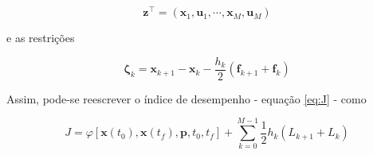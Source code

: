 \begin{equation}
    \mathbf{z}^\intercal = \left( \mathbf{x}_1, \mathbf{u}_1, \cdots, \mathbf{x}_M, \mathbf{u}_M \right)
\end{equation}

\noindent e as restrições

\begin{equation}
    \boldsymbol{\zeta}_k = \mathbf{x}_{k+1} - \mathbf{x}_k - \dfrac{h_k}{2} \left( \mathbf{f}_{k+1} + \mathbf{f}_k \right)
\end{equation}

Assim, pode-se reescrever o índice de desempenho - equação \ref{eq:J} - como

\begin{equation}
    J = \varphi \left[ \mathbf{x} \left( t_0 \right), \mathbf{x} \left( t_f \right), \mathbf{p}, t_0, t_f \right]
    + \sum_{k=0}^{M-1} \dfrac{1}{2} h_k \left( L_{k+1} + L_k \right)
\end{equation}


